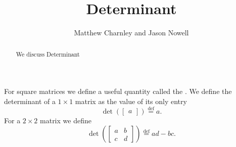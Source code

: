 \documentclass{ximera}
\title{Determinant}
\author{Matthew Charnley and Jason Nowell}
\begin{document}
\begin{abstract}
    We discuss Determinant
\end{abstract}
\maketitle


\label{det:section}


For square matrices we define a useful quantity called the \emph{}.  We define the determinant of a $1 \times 1$ matrix as the value of its only entry
\begin{equation*}
    \det \left(
        \begin{bmatrix}
            a 
        \end{bmatrix}
    \right)
    \overset{\text{def}}{=} a .
\end{equation*}
For a $2 \times 2$ matrix we define
\begin{equation*}
    \det \left(
        \begin{bmatrix}
            a & b \\
            c & d
        \end{bmatrix}
    \right)
    \overset{\text{def}}{=}
    ad-bc .
\end{equation*}
\end{document}
